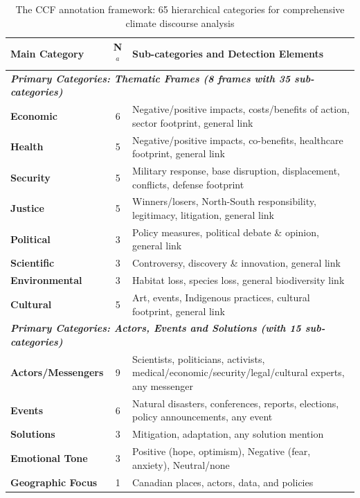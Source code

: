\documentclass[12pt]{article}
\renewcommand\_{\texttt{\detokenize{_}\allowbreak}}
\begin{document}
\begin{table}[b!]
\centering
\caption{The CCF annotation framework: 65 hierarchical categories for comprehensive climate discourse analysis}
\label{tab:framework_summary}
\footnotesize
\begin{tabularx}{\textwidth}{lcX}
\toprule
\rowcolor{gray!15}
\textbf{Main Category} & \textbf{N}$^a$ & \textbf{Sub-categories and Detection Elements} \\
\midrule
\multicolumn{3}{l}{\cellcolor{gray!10}\textbf{\textit{Primary Categories: Thematic Frames (8 frames with 35 sub-categories)}}} \\
\midrule
\textbf{Economic} & 6 & Negative/positive impacts, costs/benefits of action, sector footprint, general link \\
\textbf{Health} & 5 & Negative/positive impacts, co-benefits, healthcare footprint, general link \\
\textbf{Security} & 5 & Military response, base disruption, displacement, conflicts, defense footprint \\
\textbf{Justice} & 5 & Winners/losers, North-South responsibility, legitimacy, litigation, general link \\
\textbf{Political} & 3 & Policy measures, political debate \& opinion, general link \\
\textbf{Scientific} & 3 & Controversy, discovery \& innovation, general link \\
\textbf{Environmental} & 3 & Habitat loss, species loss, general biodiversity link \\
\textbf{Cultural} & 5 & Art, events, Indigenous practices, cultural footprint, general link \\
\midrule
\multicolumn{3}{l}{\cellcolor{gray!10}\textbf{\textit{Primary Categories: Actors, Events and Solutions (with 15 sub-categories)}}} \\
\midrule
\textbf{Actors/Messengers} & 9 & Scientists, politicians, activists, medical/economic/security/legal/cultural experts, any messenger \\
\textbf{Events} & 6 & Natural disasters, conferences, reports, elections, policy announcements, any event \\
\textbf{Solutions} & 3 & Mitigation, adaptation, any solution mention \\
\midrule
\cellcolor{gray!10}\textbf{Emotional Tone} & \cellcolor{gray!10}3 & \cellcolor{gray!10}Positive (hope, optimism), Negative (fear, anxiety), Neutral/none \\
\midrule
\cellcolor{gray!10}\textbf{Geographic Focus} & \cellcolor{gray!10}1 & \cellcolor{gray!10}Canadian places, actors, data, and policies \\

\end{tabularx}
\end{table}
\end{document}
